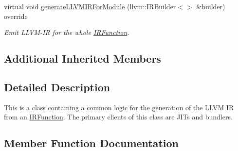\begin{DoxyCompactItemize}
\item 
\mbox{\label{classglow_1_1_c_p_u_l_l_v_m_i_r_gen_a4959fcc499c33aac349324273301c9ec}} 
virtual void \hyperlink{classglow_1_1_c_p_u_l_l_v_m_i_r_gen_a4959fcc499c33aac349324273301c9ec}{generate\+L\+L\+V\+M\+I\+R\+For\+Module} (llvm\+::\+I\+R\+Builder$<$$>$ \&builder) override
\begin{DoxyCompactList}\small\item\em Emit L\+L\+V\+M-\/\+IR for the whole \hyperlink{classglow_1_1_i_r_function}{I\+R\+Function}. \end{DoxyCompactList}\end{DoxyCompactItemize}
\subsection*{Additional Inherited Members}


\subsection{Detailed Description}
This is a class containing a common logic for the generation of the L\+L\+VM IR from an \hyperlink{classglow_1_1_i_r_function}{I\+R\+Function}. The primary clients of this class are J\+I\+Ts and bundlers. 

\subsection{Member Function Documentation}
\mbox{\label{classglow_1_1_c_p_u_l_l_v_m_i_r_gen_adbc69b398e182458dc67c93c3357b606}} 
